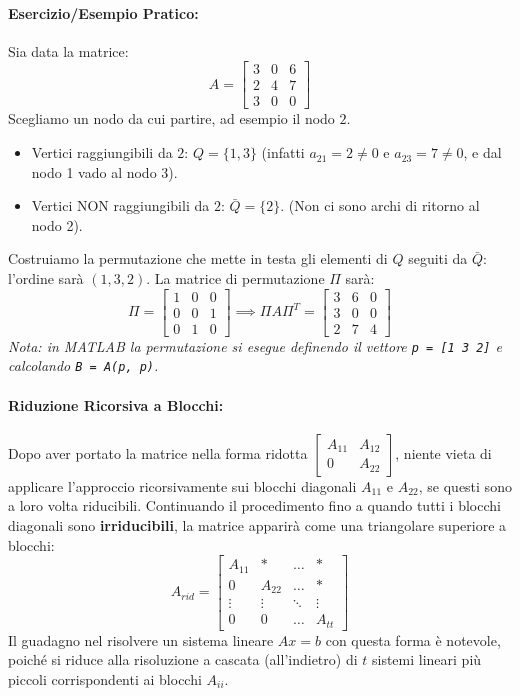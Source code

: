 \documentclass[a4paper,12pt]{article}
\begin{document}
	\paragraph{Esercizio/Esempio Pratico:}
	Sia data la matrice:
	\[
	A = \begin{bmatrix} 3 & 0 & 6 \\ 2 & 4 & 7 \\ 3 & 0 & 0 \end{bmatrix}
	\]
	Scegliamo un nodo da cui partire, ad esempio il nodo $2$.
	\begin{itemize}
		\item Vertici raggiungibili da $2$: $Q = \{1, 3\}$ (infatti $a_{21}=2 \neq 0$ e $a_{23}=7 \neq 0$, e dal nodo 1 vado al nodo 3).
		\item Vertici NON raggiungibili da $2$: $\bar{Q} = \{2\}$. (Non ci sono archi di ritorno al nodo 2).
	\end{itemize}
	Costruiamo la permutazione che mette in testa gli elementi di $Q$ seguiti da $\bar{Q}$: l'ordine sarà $(1, 3, 2)$. La matrice di permutazione $\Pi$ sarà:
	\[
	\Pi = \begin{bmatrix} 1 & 0 & 0 \\ 0 & 0 & 1 \\ 0 & 1 & 0 \end{bmatrix} \implies \Pi A \Pi^T = \begin{bmatrix} 3 & 6 & 0 \\ 3 & 0 & 0 \\ 2 & 7 & 4 \end{bmatrix}
	\]
	\textit{Nota: in MATLAB la permutazione si esegue definendo il vettore \texttt{p = [1 3 2]} e calcolando \texttt{B = A(p, p)}.}
	
	\paragraph{Riduzione Ricorsiva a Blocchi:}
	Dopo aver portato la matrice nella forma ridotta $\begin{bmatrix} A_{11} & A_{12} \\ 0 & A_{22} \end{bmatrix}$, niente vieta di applicare l'approccio ricorsivamente sui blocchi diagonali $A_{11}$ e $A_{22}$, se questi sono a loro volta riducibili.
	Continuando il procedimento fino a quando tutti i blocchi diagonali sono \textbf{irriducibili}, la matrice apparirà come una triangolare superiore a blocchi:
	\[
	A_{rid} = \begin{bmatrix} 
		A_{11} & * & \dots & * \\
		0 & A_{22} & \dots & * \\
		\vdots & \vdots & \ddots & \vdots \\
		0 & 0 & \dots & A_{tt}
	\end{bmatrix}
	\]
	Il guadagno nel risolvere un sistema lineare $Ax=b$ con questa forma è notevole, poiché si riduce alla risoluzione a cascata (all'indietro) di $t$ sistemi lineari più piccoli corrispondenti ai blocchi $A_{ii}$.
	
\end{document}
